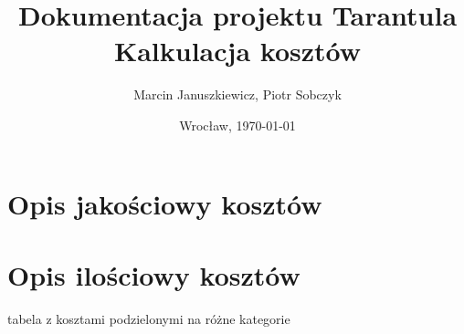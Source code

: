\documentclass[11pt,leqno]{article}
\title{\LARGE Dokumentacja projektu \textbf{Tarantula}\\
							Kalkulacja kosztów}
\author{Marcin Januszkiewicz, Piotr Sobczyk}
\date{Wrocław, \today}
\begin{document}
\maketitle 
\newpage
\tableofcontents
\newpage

\section{Opis jakościowy kosztów}

\section{Opis ilościowy kosztów}

tabela z kosztami podzielonymi na różne kategorie
\end{document}
